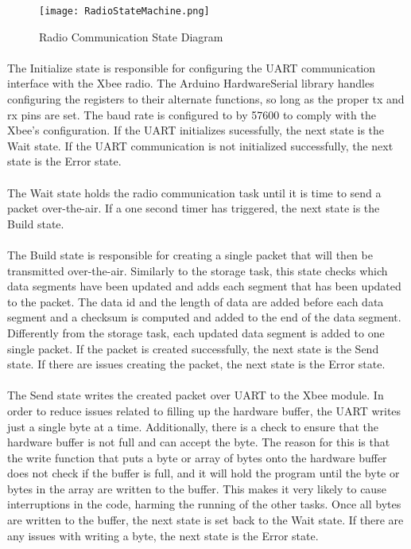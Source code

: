 \begin{figure}[H]
	\centering
	\texttt{[image: RadioStateMachine.png]}
	\caption{Radio Communication State Diagram}
	\label{fig:RadioDiagram}
\end{figure}

\paragraph{}
The Initialize state is responsible for configuring the UART communication interface with the Xbee radio.
The Arduino HardwareSerial library handles configuring the registers to their alternate functions, so long as the proper tx and rx pins are set.
The baud rate is configured to by 57600 to comply with the Xbee's configuration.
If the UART initializes sucessfully, the next state is the Wait state.
If the UART communication is not initialized successfully, the next state is the Error state.

\paragraph{}
The Wait state holds the radio communication task until it is time to send a packet over-the-air.
If a one second timer has triggered, the next state is the Build state.

\paragraph{}
The Build state is responsible for creating a single packet that will then be transmitted over-the-air.
Similarly to the storage task, this state checks which data segments have been updated and adds each segment that has been updated to the packet.
The data id and the length of data are added before each data segment and a checksum is computed and added to the end of the data segment.
Differently from the storage task, each updated data segment is added to one single packet.
If the packet is created successfully, the next state is the Send state.
If there are issues creating the packet, the next state is the Error state.

\paragraph{}
The Send state writes the created packet over UART to the Xbee module.
In order to reduce issues related to filling up the hardware buffer, the UART writes just a single byte at a time.
Additionally, there is a check to ensure that the hardware buffer is not full and can accept the byte.
The reason for this is that the write function that puts a byte or array of bytes onto the hardware buffer does not check if the buffer is full, and it will hold the program until the byte or bytes in the array are written to the buffer.
This makes it very likely to cause interruptions in the code, harming the running of the other tasks.
Once all bytes are written to the buffer, the next state is set back to the Wait state.
If there are any issues with writing a byte, the next state is the Error state.

